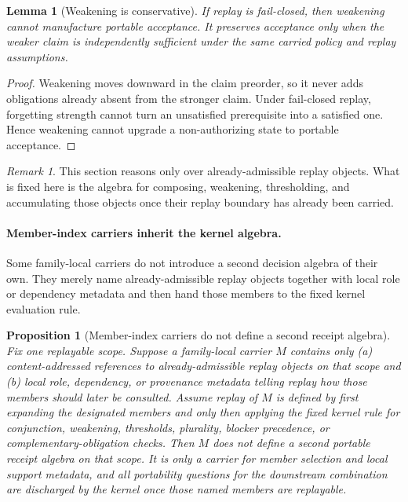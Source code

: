 \documentclass[11pt]{article}
\newtheorem{proposition}{Proposition}
\newtheorem{lemma}{Lemma}
\theoremstyle{remark}
\newtheorem{remark}{Remark}
\begin{document}
\begin{lemma}[Weakening is conservative]
If replay is fail-closed, then weakening cannot manufacture portable acceptance.
It preserves acceptance only when the weaker claim is independently sufficient under the same carried policy and replay assumptions.
\end{lemma}

\begin{proof}
Weakening moves downward in the claim preorder, so it never adds obligations already absent from the stronger claim.
Under fail-closed replay, forgetting strength cannot turn an unsatisfied prerequisite into a satisfied one.
Hence weakening cannot upgrade a non-authorizing state to portable acceptance.
\end{proof}

\begin{remark}
This section reasons only over already-admissible replay objects.
What is fixed here is the algebra for composing, weakening, thresholding, and accumulating those objects once their replay boundary has already been carried.
\end{remark}


\paragraph{Member-index carriers inherit the kernel algebra.}
Some family-local carriers do not introduce a second decision algebra of their own.
They merely name already-admissible replay objects together with local role or dependency metadata and then hand those members to the fixed kernel evaluation rule.

\begin{proposition}[Member-index carriers do not define a second receipt algebra]
\label{prop:member-index-carrier}
Fix one replayable scope.
Suppose a family-local carrier $M$ contains only
(a) content-addressed references to already-admissible replay objects on that scope and
(b) local role, dependency, or provenance metadata telling replay how those members should later be consulted.
Assume replay of $M$ is defined by first expanding the designated members and only then applying the fixed kernel rule for conjunction, weakening, thresholds, plurality, blocker precedence, or complementary-obligation checks.
Then $M$ does not define a second portable receipt algebra on that scope.
It is only a carrier for member selection and local support metadata, and all portability questions for the downstream combination are discharged by the kernel once those named members are replayable.
\end{proposition}
\end{document}
